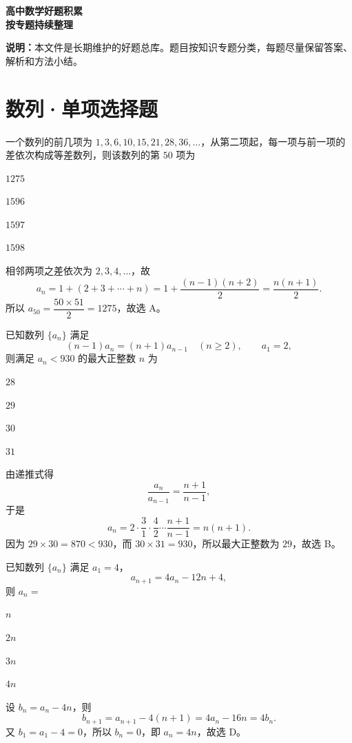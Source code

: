\documentclass[zihao=-4]{exam-zh}
\begin{document}
\begin{center}
  {\bfseries 高中数学好题积累}\\[4pt]
  {\bfseries 按专题持续整理}
\end{center}

\noindent\textbf{说明：}本文件是长期维护的好题总库。题目按知识专题分类，每题尽量保留答案、解析和方法小结。

\section{数列·单项选择题}

\begin{question}[points=5]
一个数列的前几项为 $1,3,6,10,15,21,28,36,\ldots$，从第二项起，每一项与前一项的差依次构成等差数列，则该数列的第 $50$ 项为 \paren[A]
\begin{choices}
  \item $1275$
  \item $1596$
  \item $1597$
  \item $1598$
\end{choices}
\begin{solution}
相邻两项之差依次为 $2,3,4,\ldots$，故
\[
  a_n=1+(2+3+\cdots+n)=1+\frac{(n-1)(n+2)}2=\frac{n(n+1)}2.
\]
所以 $a_{50}=\dfrac{50\times51}{2}=1275$，故选 A。
\end{solution}
\end{question}

\begin{question}[points=5]
已知数列 $\{a_n\}$ 满足
\[
  (n-1)a_n=(n+1)a_{n-1}\quad(n\ge 2),\qquad a_1=2,
\]
则满足 $a_n<930$ 的最大正整数 $n$ 为 \paren[B]
\begin{choices}
  \item $28$
  \item $29$
  \item $30$
  \item $31$
\end{choices}
\begin{solution}
由递推式得
\[
 \frac{a_n}{a_{n-1}}=\frac{n+1}{n-1},
\]
于是
\[
 a_n=2\cdot\frac31\cdot\frac42\cdots\frac{n+1}{n-1}=n(n+1).
\]
因为 $29\times30=870<930$，而 $30\times31=930$，所以最大正整数为 $29$，故选 B。
\end{solution}
\end{question}

\begin{question}[points=5]
已知数列 $\{a_n\}$ 满足 $a_1=4$，
\[
 a_{n+1}=4a_n-12n+4,
\]
则 $a_n=$ \paren[D]
\begin{choices}
  \item $n$
  \item $2n$
  \item $3n$
  \item $4n$
\end{choices}
\begin{solution}
设 $b_n=a_n-4n$，则
\[
 b_{n+1}=a_{n+1}-4(n+1)=4a_n-16n=4b_n.
\]
又 $b_1=a_1-4=0$，所以 $b_n=0$，即 $a_n=4n$，故选 D。
\end{solution}
\end{question}
\end{document}
